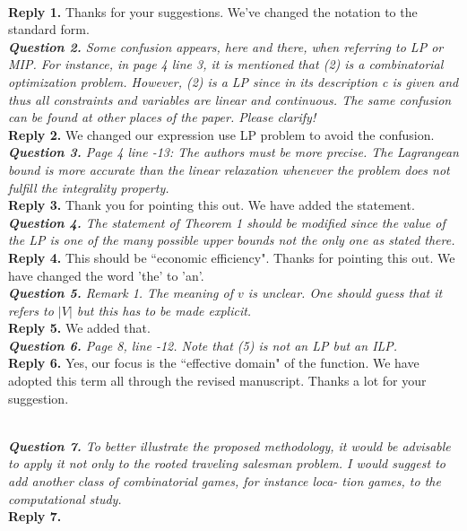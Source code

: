 \documentclass[11pt]{article}
\begin{document}
\\[2mm]
\noindent \textbf{Reply 1.}
Thanks for your suggestions.
We've changed the notation to the standard form.
\\[4mm]
%
%
%
\noindent \textit{\textbf{Question 2.}
Some confusion appears, here and there, when referring to LP or MIP.
For instance, in page 4 line 3, it is mentioned that (2) is a combinatorial
optimization problem. However, (2) is a LP since in its description c is
given and thus all constraints and variables are linear and continuous.
The same confusion can be found at other places of the paper. Please
clarify!}
\\[2mm]
\noindent \textbf{Reply 2.}
We changed our expression use LP problem to avoid the confusion.
\\[4mm]
%
%
%
\noindent \textit{\textbf{Question 3.}
Page 4 line -13: The authors must be more precise. The Lagrangean
bound is more accurate than the linear relaxation whenever the problem
does not fulfill the integrality property.
}
\\[2mm]
\noindent \textbf{Reply 3.}
Thank you for pointing this out.
We have added the statement.
\\[4mm]
%
%
%
\noindent \textit{\textbf{Question 4.}
The statement of Theorem 1 should be modified since the value of the
LP is one of the many possible upper bounds not the only one as stated
there.
}
\\[2mm]
\noinden \textbf{Reply 4.}
This should be ``economic efficiency". Thanks for pointing this out.
We have changed the word 'the' to 'an'.
\\[4mm]
%
%
%
\noindent \textit{\textbf{Question 5.}
Remark 1. The meaning of $v$ is unclear. One should guess that it refers
to $|V|$ but this has to be made explicit.
}
\\[2mm]
\noindent \textbf{Reply 5.}
We added that.
\\[4mm]
%
%
%
\noindent \textit{\textbf{Question 6.}
Page 8, line -12. Note that (5) is not an LP but an ILP.
}
\\[2mm]
\noindent \textbf{Reply 6.}
Yes, our focus is the ``effective domain" of the function.
We have adopted this term all through the revised manuscript.
Thanks a lot for your suggestion.

\\[4mm]
%
%
%
\noindent \textit{\textbf{Question 7.}
To better illustrate the proposed methodology, it would be advisable
to apply it not only to the rooted traveling salesman problem. I would
suggest to add another class of combinatorial games, for instance loca-
tion games, to the computational study.}
\\[2mm]
\noindent \textbf{Reply 7.}
\end{document}
